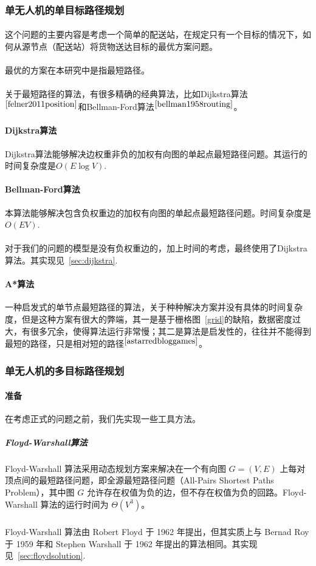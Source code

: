 \documentclass[UTF8,a4paper]{ctexart}
\begin{document}
\subsubsection{单无人机的单目标路径规划}
\paragraph{}这个问题的主要内容是考虑一个简单的配送站，在规定只有一个目标的情况下，如何从源节点（配送站）将货物送达目标的最优方案问题。
\paragraph{}最优的方案在本研究中是指最短路径。
\paragraph{}关于最短路径的算法，有很多精确的经典算法，比如Dijkstra算法$^{\cite{felner2011position}}$和Bellman-Ford算法$^{\cite{bellman1958routing}}$。
\paragraph{Dijkstra算法}Dijkstra算法能够解决边权重非负的加权有向图的单起点最短路径问题。其运行的时间复杂度是$O(E\log{V})$.
\paragraph{Bellman-Ford算法}本算法能够解决包含负权重边的加权有向图的单起点最短路径问题。时间复杂度是$O(EV)$.
\paragraph{}对于我们的问题的模型是没有负权重边的，加上时间的考虑，最终使用了Dijkstra算法。其实现见~\ref{sec:dijkstra}.

\paragraph{A*算法}一种启发式的单节点最短路径的算法，关于种种解决方案并没有具体的时间复杂度，但是这种方案有很大的弊端，其一是基于栅格图~\ref{grid}的缺陷，数据密度过大，有很多冗余，使得算法运行非常慢；其二是算法是启发性的，往往并不能得到最短的路径，只是相对短的路径$^{\cite{astarredbloggames}}$。


\subsubsection{单无人机的多目标路径规划}
\paragraph{准备}在考虑正式的问题之前，我们先实现一些工具方法。
\subparagraph{Floyd-Warshall算法}Floyd-Warshall 算法采用动态规划方案来解决在一个有向图 $G = (V, E)$ 上每对顶点间的最短路径问题，即全源最短路径问题（All-Pairs Shortest Paths Problem），其中图 $G$ 允许存在权值为负的边，但不存在权值为负的回路。Floyd-Warshall 算法的运行时间为 $Θ(V^3)$。
\subparagraph{}Floyd-Warshall 算法由 Robert Floyd 于 1962 年提出，但其实质上与 Bernad Roy 于 1959 年和 Stephen Warshall 于 1962 年提出的算法相同。其实现见~\ref{sec:floydsolution}.
\end{document}
